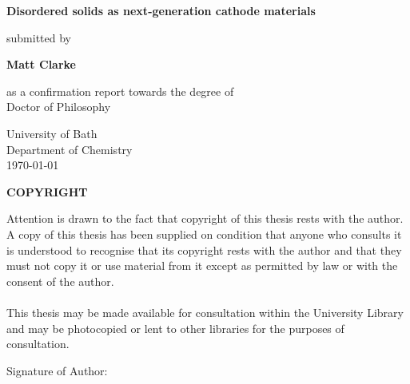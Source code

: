 \documentclass[11pt, oneside]{report}
\begin{document}
	
\setcounter{tocdepth}{1} 

\begin{titlepage}
\begin{center}
\vspace*{1cm}
 
\LARGE
\textbf{Disordered solids as next-generation cathode materials}
       
\vspace{0.5cm}
\normalsize       
submitted by
       
      
\Large
\textbf{Matt Clarke}
 
\vspace{0.5cm}
\normalsize
as a confirmation report towards the degree of\\
Doctor of Philosophy
 
\vspace{0.5cm}
       
\LARGE
University of Bath\\
\normalsize
Department of Chemistry\\
       
\vspace{0.8cm}
\today
       
\vfill
\large
\textbf{COPYRIGHT}
\end{center}
Attention is drawn to the fact that copyright of this thesis rests with the author. A
copy of this thesis has been supplied on condition that anyone who consults it is
understood to recognise that its copyright rests with the author and that they must
not copy it or use material from it except as permitted by law or with the consent of
the author.
\\
\\
This thesis may be made available for consultation within the University Library and may be photocopied or lent to other libraries for the purposes of consultation.

\vspace{2cm}
\noindent Signature of Author: \dotfill
   
\end{titlepage}

\tableofcontents
{}
\listoffigures

\newpage
{}









\pagestyle{empty}
\end{document}
